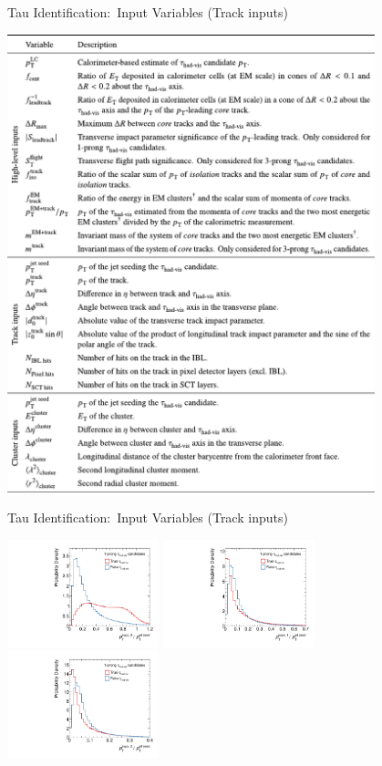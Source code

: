 \documentclass[11pt, xcolor={dvipsnames}, aspectratio=169, notes]{beamer}
\begin{document}

\begin{frame}{Tau Identification:\ Input Variables (Track inputs)}
  \centering

  \includegraphics[width=0.8\textwidth, trim=0 1.55in 0 3.5in,
  clip]{backup/tauid_variable_table}
\end{frame}


\begin{frame}{Tau Identification:\ Input Variables (Track inputs)}
  \centering

  \includegraphics[width=0.33\textwidth]{tauid/invars/invars_trk0relpt_1P}%
  \includegraphics[width=0.33\textwidth]{tauid/invars/invars_trk1relpt_1P}%
  \includegraphics[width=0.33\textwidth]{tauid/invars/invars_trk2relpt_1P}
\end{frame}
\end{document}
